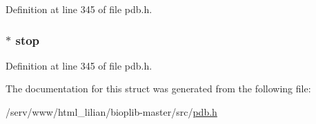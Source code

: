 Definition at line 345 of file pdb.\-h.

\hypertarget{structpdbchain_a6d5bcaf01a13f97f8d88c5d489b48fec}{
\subsubsection[{stop}]{ $\ast$ stop}}\label{structpdbchain_a6d5bcaf01a13f97f8d88c5d489b48fec}


Definition at line 345 of file pdb.\-h.



The documentation for this struct was generated from the following file\-:\begin{DoxyCompactItemize}
\item 
/serv/www/html\-\_\-lilian/bioplib-\/master/src/\hyperlink{pdb_8h}{pdb.\-h}\end{DoxyCompactItemize}
